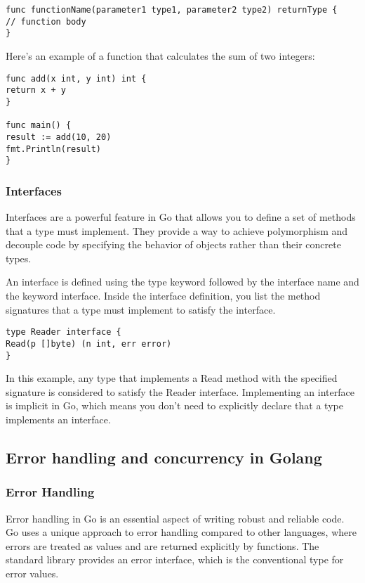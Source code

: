 \documentclass{article}
\begin{document}
\begin{verbatim}
func functionName(parameter1 type1, parameter2 type2) returnType {
// function body
}
\end{verbatim}

Here's an example of a function that calculates the sum of two integers:

\begin{verbatim}
func add(x int, y int) int {
return x + y
}

func main() {
result := add(10, 20)
fmt.Println(result)
}
\end{verbatim}

\subsubsection{Interfaces}

Interfaces are a powerful feature in Go that allows you to define a set of methods that a type must implement. They provide a way to achieve polymorphism and decouple code by specifying the behavior of objects rather than their concrete types.

An interface is defined using the type keyword followed by the interface name and the keyword interface. Inside the interface definition, you list the method signatures that a type must implement to satisfy the interface.

\begin{verbatim}
type Reader interface {
Read(p []byte) (n int, err error)
}
\end{verbatim}

In this example, any type that implements a Read method with the specified signature is considered to satisfy the Reader interface. Implementing an interface is implicit in Go, which means you don't need to explicitly declare that a type implements an interface.





\subsection{Error handling and concurrency in Golang}

\subsubsection{Error Handling}

Error handling in Go is an essential aspect of writing robust and reliable code. Go uses a unique approach to error handling compared to other languages, where errors are treated as values and are returned explicitly by functions. The standard library provides an error interface, which is the conventional type for error values.
\end{document}
